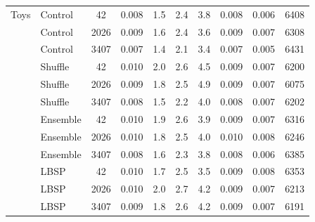\begin{longtable}{@{}llS[table-format=4.0,group-digits=false]S[table-format=1.3]S[table-format=2.1]S[table-format=2.1]S[table-format=2.1]S[table-format=1.3]S[table-format=1.3]S[table-format=5.0]@{}}
\midrule
Toys & Control & 42 & 0.008 & 1.5 & 2.4 & 3.8 & 0.008 & 0.006 & 6408\\ %
 & Control & 2026 & 0.009 & 1.6 & 2.4 & 3.6 & 0.009 & 0.007 & 6308\\ %
 & Control & 3407 & 0.007 & 1.4 & 2.1 & 3.4 & 0.007 & 0.005 & 6431\\ %
 & Shuffle & 42 & 0.010 & 2.0 & 2.6 & 4.5 & 0.009 & 0.007 & 6200\\ %
 & Shuffle & 2026 & 0.009 & 1.8 & 2.5 & 4.9 & 0.009 & 0.007 & 6075\\ %
 & Shuffle & 3407 & 0.008 & 1.5 & 2.2 & 4.0 & 0.008 & 0.007 & 6202\\ %
 & Ensemble & 42 & 0.010 & 1.9 & 2.6 & 3.9 & 0.009 & 0.007 & 6316\\ %
 & Ensemble & 2026 & 0.010 & 1.8 & 2.5 & 4.0 & 0.010 & 0.008 & 6246\\ %
 & Ensemble & 3407 & 0.008 & 1.6 & 2.3 & 3.8 & 0.008 & 0.006 & 6385\\ %
 & LBSP & 42 & 0.010 & 1.7 & 2.5 & 3.5 & 0.009 & 0.008 & 6353\\ %
 & LBSP & 2026 & 0.010 & 2.0 & 2.7 & 4.2 & 0.009 & 0.007 & 6213\\ %
 & LBSP & 3407 & 0.009 & 1.8 & 2.6 & 4.2 & 0.009 & 0.007 & 6191\\ %
\end{longtable}
\endgroup
